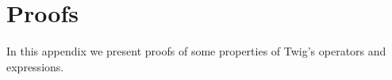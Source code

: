 
\chapter{Proofs}

In this appendix we present proofs of some properties of Twig's
operators and expressions.



